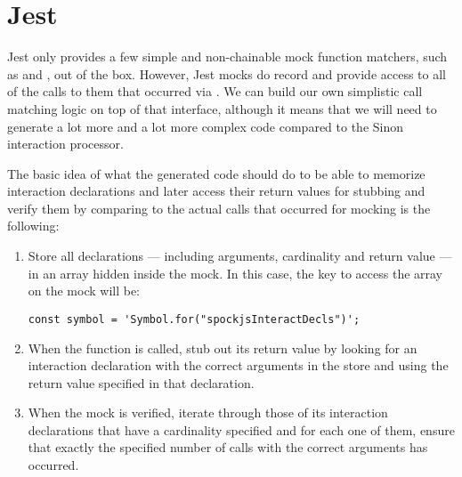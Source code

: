 \section{Jest}
Jest only provides a few simple and non-chainable mock function matchers,
such as  and ,
out of the box.
However, Jest mocks do record and provide access to
all of the calls to them that occurred via
.
We can build our own simplistic call matching logic
on top of that interface,
although it means that we will need to
generate a lot more and a lot more complex code
compared to the Sinon interaction processor.

The basic idea of what the generated code should do
to be able to memorize interaction declarations
and later access their return values for stubbing
and verify them by comparing to the actual calls that occurred for mocking
is the following:
\begin{enumerate}
  \item Store all declarations
    --- including arguments, cardinality and return value ---
    in an array hidden inside the mock.
    In this case, the key to access the array on the mock will be:
    \begin{verbatim}
const symbol = 'Symbol.for("spockjsInteractDecls")';
    \end{verbatim}
  \item When the function is called,
    stub out its return value by
    looking for an interaction declaration
    with the correct arguments in the store
    and using the return value specified in that declaration.
  \item When the mock is verified,
    iterate through those of its interaction declarations
    that have a cardinality specified
    and for each one of them,
    ensure that exactly the specified number of calls
    with the correct arguments has occurred.
\end{enumerate}
